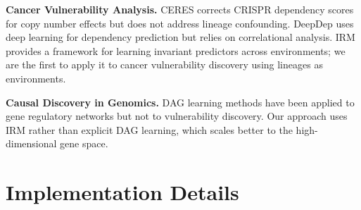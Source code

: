 \documentclass{article}
\begin{document}
\textbf{Cancer Vulnerability Analysis.} CERES \citep{meyers_2017_ceres} corrects CRISPR dependency scores for copy number effects but does not address lineage confounding. DeepDep \citep{deepdep_2021} uses deep learning for dependency prediction but relies on correlational analysis. IRM \citep{arjovsky_2019_irm} provides a framework for learning invariant predictors across environments; we are the first to apply it to cancer vulnerability discovery using lineages as environments.

\textbf{Causal Discovery in Genomics.} DAG learning methods \citep{zheng_2018_notears} have been applied to gene regulatory networks but not to vulnerability discovery. Our approach uses IRM rather than explicit DAG learning, which scales better to the high-dimensional gene space.


\section{Implementation Details}
\label{app:implementation}
\end{document}
